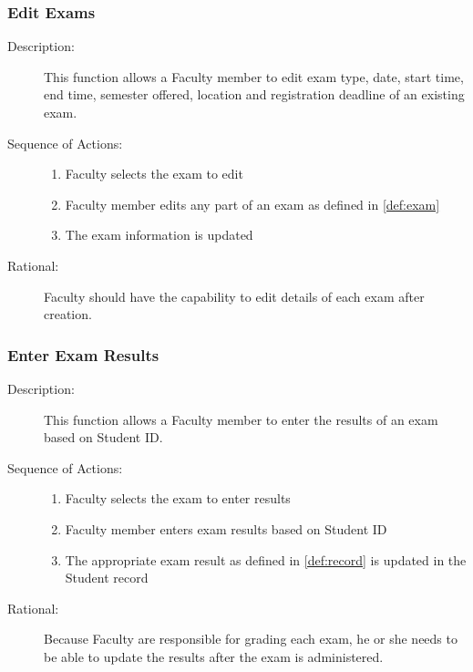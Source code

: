    \subsubsection{\large Edit Exams} 
   \begin{boxed} %
      \begin{description}
         \item[Description:\label{desc:edit_exams}]
      This function allows a Faculty member to edit exam type, date, start time,
      end time, semester offered, location and registration deadline of an
      existing exam.
         
            \item[Sequence of Actions:]\hspace{10cm}
         \begin{enumerate}
            \item Faculty selects the exam to edit
            \item Faculty member edits any part of an exam as defined in
               \ref{def:exam}
            \item The exam information is updated
         \end{enumerate}

            \item[Rational:]
         Faculty should have the capability to edit details of each exam after
         creation.
      \end{description}
   \end{boxed} %

   \subsubsection{\large Enter Exam Results} 
   \begin{boxed} %
      \begin{description}
            \item[Description:\label{desc:enter_results}]
      This function allows a Faculty member to enter the results of an exam
      based on Student ID.
         
            \item[Sequence of Actions:]\hspace{10cm}
         \begin{enumerate}
               
            \item Faculty selects the exam to enter results
            \item Faculty member enters exam results based on Student ID
            \item The appropriate exam result as defined in \ref{def:record} is updated in the Student record
         \end{enumerate}

            \item[Rational:]
         Because Faculty are responsible for grading each exam, he or she needs
         to be able to update the results after the exam is administered.
      \end{description}
   \end{boxed} %

